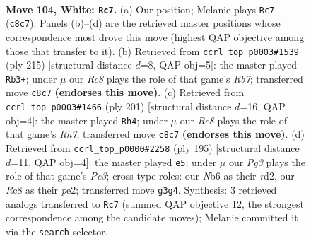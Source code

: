 \documentclass[11pt]{article}
\begin{document}
\clearpage

\begin{figure}[p]\centering
\begin{subfigure}{0.46\textwidth}\centering
\resizebox{\linewidth}{!}{%
\newchessgame
\chessboard[
  setfen={2R5/6pk/1N3p2/7p/7P/6PK/5r2/8 w - - 32 104},
  showmover=false,
  pgfstyle=straightmove, color=movearrow, markmove={c8-c7}
]}
\caption{}
\end{subfigure}\hfill
\begin{subfigure}{0.46\textwidth}\centering
\resizebox{\linewidth}{!}{%
\newchessgame
\chessboard[
  setfen={8/8/6pk/7p/2R4P/4KPP1/1r6/8 b - - 83 108},
  showmover=false,
  pgfstyle=straightmove, color=movearrow, markmove={b2-b3}
]}
\caption{}
\end{subfigure}
\\[4pt]
\begin{subfigure}{0.46\textwidth}\centering
\resizebox{\linewidth}{!}{%
\newchessgame
\chessboard[
  setfen={8/5pk1/4p3/4P1P1/5P2/5K2/7r/3R4 b - - 18 101},
  showmover=false,
  pgfstyle=straightmove, color=movearrow, markmove={h2-h4}
]}
\caption{}
\end{subfigure}\hfill
\begin{subfigure}{0.46\textwidth}\centering
\resizebox{\linewidth}{!}{%
\newchessgame
\chessboard[
  setfen={8/1r6/4pk2/6p1/5pP1/5P2/3RP1K1/8 b - - 97 98},
  showmover=false,
  pgfstyle=straightmove, color=movearrow, markmove={e6-e5}
]}
\caption{}
\end{subfigure}
\caption{\textbf{Move 104, White: \texttt{Rc7}.} (a) Our position; Melanie plays \texttt{Rc7} (\texttt{c8c7}). Panels (b)--(d) are the retrieved master positions whose correspondence most drove this move (highest QAP objective among those that transfer to it). (b) Retrieved from \texttt{ccrl\_top\_p0003\#1539} (ply 215) [structural distance $d$=8, QAP obj=5]: the master played \texttt{Rb3+}; under $\mu$ our \emph{Rc8} plays the role of that game's \emph{Rb7}; transferred move \texttt{c8c7} \textbf{(endorses this move)}. (c) Retrieved from \texttt{ccrl\_top\_p0003\#1466} (ply 201) [structural distance $d$=16, QAP obj=4]: the master played \texttt{Rh4}; under $\mu$ our \emph{Rc8} plays the role of that game's \emph{Rh7}; transferred move \texttt{c8c7} \textbf{(endorses this move)}. (d) Retrieved from \texttt{ccrl\_top\_p0000\#2258} (ply 195) [structural distance $d$=11, QAP obj=4]: the master played \texttt{e5}; under $\mu$ our \emph{Pg3} plays the role of that game's \emph{Pe3}; cross-type roles: our \emph{N}b6 as their \emph{r}d2, our \emph{R}c8 as their \emph{p}e2; transferred move \texttt{g3g4}. Synthesis: 3 retrieved analogs transferred to \texttt{Rc7} (summed QAP objective 12, the strongest correspondence among the candidate moves); Melanie committed it via the \texttt{search} selector.}
\label{fig:thought-m206}
\end{figure}
\end{document}
